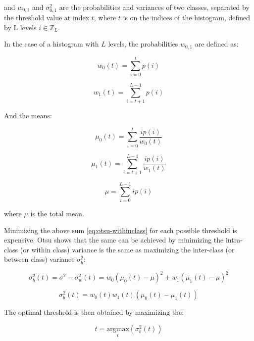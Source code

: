 and $w_{0,1}$ and $\sigma_{0,1}^2$ are the probabilities and variances of two classes, separated by the threshold value at index $t$, where $t$ is on the indices of the histogram, defined by L levels $i \in \mathbb{Z}_L$. 

In the case of a histogram with $L$ levels, the probabilities $w_{0,1}$ are defined as:

\begin{equation}
w_0(t) = \sum_{i=0}^{t}{p(i)}
\end{equation}

\begin{equation}
w_1(t) = \sum_{i=t+1}^{L-1}{p(i)}
\end{equation}

And the means:

\begin{equation}
\mu_0(t) = \sum_{i=0}^{t}{\frac{i p(i)}{w_0(t)}}
\end{equation}

\begin{equation}
\mu_1(t) = \sum_{i=t+1}^{L-1}{\frac{i p(i)}{w_1(t)}}
\end{equation}

\begin{equation}
\mu = \sum_{i=0}^{L-1}{i p(i)}
\end{equation}

where $\mu$ is the total mean. 

Minimizing the above sum \ref{eq:otsu-withinclass} for each possible threshold is expensive. Otsu shows that the same can be achieved by minimizing the intra-class (or within class) variance is the same as maximizing the inter-class (or between class) variance $\sigma_b^2$:

\begin{equation}
\sigma_b^2(t) = \sigma^2 - \sigma_w^2(t) = w_0 \left(\mu_0(t) - \mu \right)^2 + w_1 \left(\mu_1(t) - \mu \right)^2 
\end{equation}

\begin{equation}
\sigma_b^2(t) = w_0(t) w_1(t) \left( \mu_0(t) - \mu_1(t) \right)
\label{eq:otsu_between_variance}
\end{equation}

The optimal threshold is then obtained by maximizing the:

\begin{equation}
t = \underset{t}{\mathrm{argmax}}\left(\sigma_b^2(t)\right)
\end{equation}

